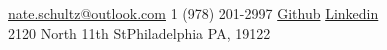\documentclass[10pt,a4paper]{article} %
\begin{document}
 



\noindent\href{mailto:nate.schultz@outlook.com}{nate.schultz@outlook.com}\bull %
\textsmaller{+}1 (978) 201-2997\bull %
\href{https://github.com/beefy}{Github} \bull \href{https://www.linkedin.com/in/beefybeefy/}{Linkedin}\\ %
2120 North 11th St\bull Philadelphia PA, 19122%

\spacedhrule{0.9em}{-0.4em} %





\end{document}
